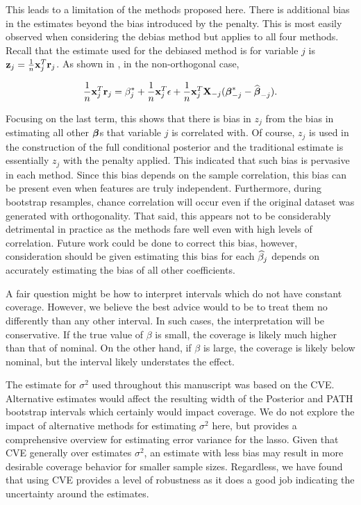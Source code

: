 This leads to a limitation of the methods proposed here. There is additional bias in the estimates beyond the bias introduced by the penalty. This is most easily observed when considering the debias method but applies to all four methods. Recall that the estimate used for the debiased method is for variable $j$ is $\mathbf{z}_j = \frac{1}{n}\mathbf{x}^T_j \mathbf{r}_j$. As shown in \cite{Breheny2019}, in the non-orthogonal case, 

$$
\frac{1}{n}\mathbf{x}^T_j \mathbf{r}_j = \beta^*_j + \frac{1}{n}\mathbf{x}_j^T \epsilon + \frac{1}{n}\mathbf{x}_j^T \mathbf{X}_{-j}(\boldsymbol{\beta}^*_{-j} - \widehat{\boldsymbol{\beta}}_{-j}).
$$

Focusing on the last term, this shows that there is bias in $z_j$ from the bias in estimating all other $\boldsymbol{\beta}$s that variable $j$ is correlated with. Of course, $z_j$ is used in the construction of the full conditional posterior and the traditional estimate is essentially $z_j$ with the penalty applied. This indicated that such bias is pervasive in each method. Since this bias depends on the sample correlation, this bias can be present even when features are truly independent. Furthermore, during bootstrap resamples, chance correlation will occur even if the original dataset was generated with orthogonality. That said, this appears not to be considerably detrimental in practice as the methods fare well even with high levels of correlation. Future work could be done to correct this bias, however, consideration should be given estimating this bias for each $\widehat{\beta}_j$ depends on accurately estimating the bias of all other coefficients.


A fair question might be how to interpret intervals which do not have constant coverage. However, we believe the best advice would to be to treat them no differently than any other interval. In such cases, the interpretation will be conservative. If the true value of $\beta$ is small, the coverage is likely much higher than that of nominal. On the other hand, if $\beta$ is large, the coverage is likely below nominal, but the interval likely understates the effect.

The estimate for $\sigma^2$ used throughout this manuscript was based on the CVE. Alternative estimates would affect the resulting width of the Posterior and PATH bootstrap intervals which certainly would impact coverage. We do not explore the impact of alternative methods for estimating $\sigma^2$ here, but \cite{Reid2016} provides a comprehensive overview for estimating error variance for the lasso. Given that CVE generally over estimates $\sigma^2$, an estimate with less bias may result in more desirable coverage behavior for smaller sample sizes. Regardless, we have found that using CVE provides a level of robustness as it does a good job indicating the uncertainty around the estimates.

